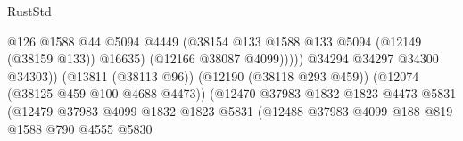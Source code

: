 \begin{lexlean}{RustStd}
\begin{coremodule}
                                                            @126
                                                            @1588
                                                            @44
                                                            @5094
                                                            @4449
                                                            (@38154
                                                              @133
                                                              @1588
                                                              @133
                                                              @5094
                                                              (@12149 (@38159 @133))
                                                              @16635)
                                                            (@12166 @38087 @4099)))))
                                                    @34294
                                                    @34297
                                                    @34300
                                                    @34303))
                                                (@13811 (@38113 @96))
                                                (@12190 (@38118 @293 @459))
                                                (@12074 (@38125 @459 @100 @4688 @4473))
                                                (@12470
                                                  @37983
                                                  @1832
                                                  @1823
                                                  @4473
                                                  @5831
                                                  (@12479
                                                    @37983
                                                    @4099
                                                    @1832
                                                    @1823
                                                    @5831
                                                    (@12488
                                                      @37983
                                                      @4099
                                                      @188
                                                      @819
                                                      @1588
                                                      @790
                                                      @4555
                                                      @5830

\end{coremodule}
\end{lexlean}
